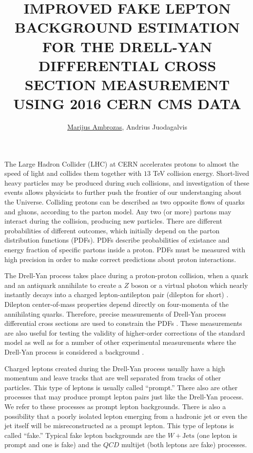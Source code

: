 \documentclass[a4paper,10pt,english]{article}
\begin{document}
\renewcommand{\figurename}{Fig.} 


\title{IMPROVED FAKE LEPTON BACKGROUND ESTIMATION FOR THE DRELL-YAN DIFFERENTIAL CROSS SECTION MEASUREMENT USING 2016 CERN CMS DATA}


\author{\uline{Marijus Ambrozas}, Andrius Juodagalvis}

\maketitle

\address{Institute of Theoretical Physics and Astronomy, Faculty of Physics, Vilnius University, Lithuania}


The Large Hadron Collider (LHC) at CERN accelerates protons to almost the speed of light and collides them together
with $13$ TeV collision energy.
Short-lived heavy particles may be produced during such collisions, and investigation of these events allows physicists
to further push the frontier of our understanging about the Universe.
Colliding protons can be described as two opposite flows of quarks and gluons, according to the parton model.
Any two (or more) partons may interact during the collision, producing new particles.
There are different probabilities of different outcomes, which initially depend on the parton distribution functions (PDFs).
PDFs describe probabilities of existance and energy fraction of specific partons inside a proton.
PDFs must be measured with high precision in order to make correct predictions about proton interactions.

The Drell-Yan process takes place during a proton-proton collision, when a quark and an antiquark annihilate to create
a $Z$ boson or a virtual photon which nearly instantly decays into a charged lepton-antilepton pair (dilepton for short) \cite{DY}.
Dilepton center-of-mass properties depend directly on four-momenta of the annihilating quarks.
Therefore, precise measurements of Drell-Yan process differential cross sections are used to constrain the PDFs \cite{DY13}.
These measurements are also useful for testing the validity of higher-order corrections of the standard model as
well as for a number of other experimental measurements where the Drell-Yan process is considered a background \cite{Higgs, Zprime, SUSY}.

Charged leptons created during the Drell-Yan process usually have a high momentum and leave tracks that are well separated
from tracks of other particles.
This type of leptons is usually called ``prompt.''
There also are other processes that may produce prompt lepton pairs just like the Drell-Yan process.
We refer to these processes as prompt lepton backgrounds.
There is also a possibility that a poorly isolated lepton emerging from a hadronic jet or even the jet itself
will be misreconstructed as a prompt lepton.
This type of leptons is called ``fake.''
Typical fake lepton backgrounds are the $W\!+\!\mathrm{Jets}$ (one lepton is prompt and one is fake) and the $QC\!D$ multijet
(both leptons are fake) processes.
\end{document}
